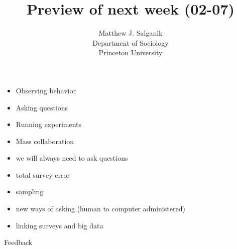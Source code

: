 \documentclass[aspectratio=169]{beamer}
\title[]{Preview of next week (02-07)}
\author[]{Matthew J. Salganik\\Department of Sociology\\Princeton University}
\date[]{Soc 596: Computational Social Science
\vfill
\begin{flushright}
\vspace{0.6in}
\texttt{[image: figures/cc.png]}
\end{flushright}
}
\begin{document}
\frame{\titlepage}
\begin{frame}

\begin{itemize}
\item Observing behavior
\item Asking questions
\item Running experiments
\item Mass collaboration
\end{itemize}

\end{frame}
\begin{frame}

\begin{itemize}
\item we will always need to ask questions
\item total survey error
\item sampling
\item new ways of asking (human to computer administered)
\item linking surveys and big data
\end{itemize}

\end{frame}
\begin{frame}

\begin{center}
\Large{
Feedback
}
\end{center}

\end{frame}
\end{document}
